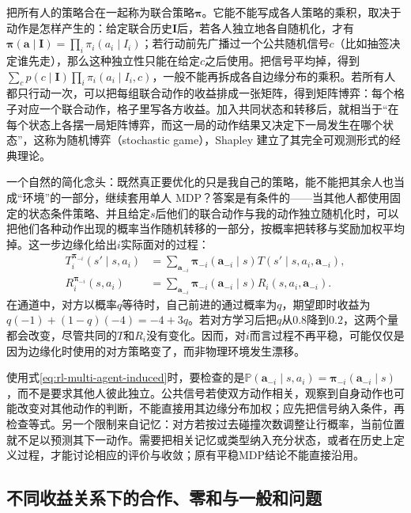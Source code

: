 把所有人的策略合在一起称为联合策略$\bm\pi$。它能不能写成各人策略的乘积，取决于动作是怎样产生的：给定联合历史$\bm I$后，若各人独立地各自随机化，才有$\bm\pi(\bm a\mid\bm I)=\prod_i\pi_i(a_i\mid I_i)$；若行动前先广播过一个公共随机信号$c$（比如抽签决定谁先走），那么这种独立性只能在给定$c$之后使用。把信号平均掉，得到$\sum_c p(c\mid\bm I)\prod_i\pi_i(a_i\mid I_i,c)$，一般不能再拆成各自边缘分布的乘积。若所有人都只行动一次，可以把每组联合动作的收益排成一张矩阵，得到矩阵博弈：每个格子对应一个联合动作，格子里写各方收益。加入共同状态和转移后，就相当于“在每个状态上各摆一局矩阵博弈，而这一局的动作结果又决定下一局发生在哪个状态”，这称为随机博弈（stochastic game），Shapley 建立了其完全可观测形式的经典理论。

一个自然的简化念头：既然真正要优化的只是我自己的策略，能不能把其余人也当成“环境”的一部分，继续套用单人 MDP？答案是有条件的——当其他人都使用固定的状态条件策略、并且给定$s$后他们的联合动作与我的动作独立随机化时，可以把他们各种动作出现的概率当作随机转移的一部分，按概率把转移与奖励加权平均掉。这一步边缘化给出$i$实际面对的过程：
\begin{align}
 T_i^{\bm\pi_{-i}}(s'\mid s,a_i)
 &=\sum_{\bm a_{-i}}\bm\pi_{-i}(\bm a_{-i}\mid s)
 T(s'\mid s,a_i,\bm a_{-i}),\label{eq:rl-multi-agent-induced}\\
 R_i^{\bm\pi_{-i}}(s,a_i)
 &=\sum_{\bm a_{-i}}\bm\pi_{-i}(\bm a_{-i}\mid s)
 R_i(s,a_i,\bm a_{-i}).\nonumber
\end{align}
在通道中，对方以概率$q$等待时，自己前进的通过概率为$q$，期望即时收益为$q(-1)+(1-q)(-4)=-4+3q$。若对方学习后把$q$从$0.8$降到$0.2$，这两个量都会改变，尽管共同的$T$和$R_i$没有变化。因而，对$i$而言过程不再平稳，可能仅仅是因为边缘化时使用的对方策略变了，而非物理环境发生漂移。

使用式\eqref{eq:rl-multi-agent-induced}时，要检查的是$\mathbb P(\bm a_{-i}\mid s,a_i)=\bm\pi_{-i}(\bm a_{-i}\mid s)$，而不是要求其他人彼此独立。公共信号若使双方动作相关，观察到自身动作也可能改变对其他动作的判断，不能直接用其边缘分布加权；应先把信号纳入条件，再检查等式。另一个限制来自记忆：对方若按过去碰撞次数调整让行概率，当前位置就不足以预测其下一动作。需要把相关记忆或类型纳入充分状态，或者在历史上定义过程，才能讨论相应的评价与收敛；原有平稳MDP结论不能直接沿用。

\subsection{不同收益关系下的合作、零和与一般和问题}
\label{sec:rl-multi-agent-payoffs}


